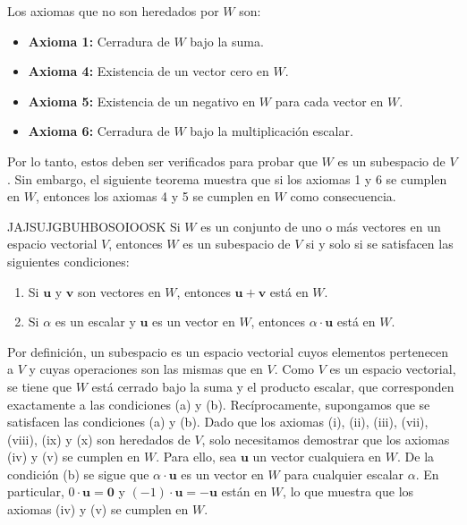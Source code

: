 \noindent Los axiomas que no son heredados por $W$ son:
\begin{itemize}
    \item \textbf{Axioma 1:} Cerradura de $W$ bajo la suma.
    \item \textbf{Axioma 4:} Existencia de un vector cero en $W$.
    \item \textbf{Axioma 5:} Existencia de un negativo en $W$ para cada vector en $W$.
    \item \textbf{Axioma 6:} Cerradura de $W$ bajo la multiplicación escalar.
\end{itemize}
Por lo tanto, estos deben ser verificados para probar que $W$ es un subespacio de $V$. Sin embargo, el siguiente teorema muestra que si los axiomas 1 y 6 se cumplen en $W$, entonces los axiomas 4 y 5 se cumplen en $W$ como consecuencia.

\begin{theorem}{}{JAJSUJGBUHBOSOIOOSK}
    Si $W$ es un conjunto de uno o más vectores en un espacio vectorial $V$, entonces $W$ es un subespacio de $V$ si y solo si se satisfacen las siguientes condiciones:
    \begin{enumerate}[label=\alph*), topsep=6pt, itemsep=0pt]
        \item Si $\mathbf{u}$ y $\mathbf{v}$ son vectores en $W$, entonces $\mathbf{u} + \mathbf{v}$ está en $W$.
        \item Si $\alpha$ es un escalar y $\mathbf{u}$ es un vector en $W$, entonces $\alpha \cdot \mathbf{u}$ está en $W$.
    \end{enumerate}

    \tcblower
    \demostracion Por definición, un subespacio es un espacio vectorial cuyos elementos pertenecen a $V$ y cuyas operaciones son las mismas que en $V$. Como $V$ es un espacio vectorial, se tiene que $W$ está cerrado bajo la suma y el producto escalar, que corresponden exactamente a las condiciones (a) y (b). Recíprocamente, supongamos que se satisfacen las condiciones (a) y (b). Dado que los axiomas (i), (ii), (iii), (vii), (viii), (ix) y (x) son heredados de $V$, solo necesitamos demostrar que los axiomas (iv) y (v) se cumplen en $W$. Para ello, sea $\mathbf{u}$ un vector cualquiera en $W$. De la condición (b) se sigue que $\alpha \cdot \mathbf{u}$ es un vector en $W$ para cualquier escalar $\alpha$. En particular, $0 \cdot \mathbf{u} = \mathbf{0}$ y $(-1) \cdot \mathbf{u} = -\mathbf{u}$ están en $W$, lo que muestra que los axiomas (iv) y (v) se cumplen en $W$. 
\end{theorem}


